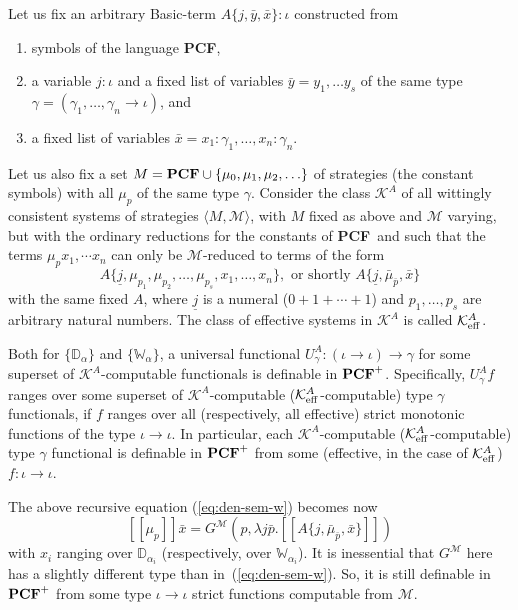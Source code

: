 \documentclass[fleqn]{LMCS}
\theoremstyle{plain}\newtheorem{satz}[thm]{Satz}
\theoremstyle{plain}\newtheorem{hyp}[thm]{Hypothesis}
\theoremstyle{plain}\newtheorem{hyps}[thm]{Hypotheses}
\theoremstyle{definition}\newtheorem{note}[thm]{Note}
\newcommand{\setof}[1]{\{#1\}}
\newcommand{\arr}{\rightarrow}
\newcommand{\la}{\langle}
\newcommand{\ra}{\rangle}
\newcommand{\Dsem}[1]{[\![ #1 ]\!]}
\newcommand{\tuple}[1]{\la #1 \ra}
\newcommand{\tbbW}{\mathbb{W}}\newcommand{\bbD}{\mathbb{D}}
\newcommand{\PCF}{\mbox{\bf PCF}}
\newcommand{\KA}{{\mathcal K}^A}
\newcommand{\KAeff}{{\mathcal K}^A_{\rm eff}}
\newcommand{\jj}{\underline{j}}
\newcommand{\MM}{{\mathcal M}}
\newcommand{\bx}{\bar{x}}
\newcommand{\?}{\mbox{?}}
\begin{document}
\noindent
Let us fix an arbitrary Basic-term $A\setof{j,\bar{y},\bx}:\iota$ 
constructed from 
\begin{enumerate}[$\bullet$]
\item 
symbols of the language \PCF,  
\item
a variable $j:\iota$ and a fixed list of variables
$\bar{y}=y_1,\ldots y_s$ of the same type 
$\gamma=(\gamma_1,\ldots,\gamma_n\arr \iota)$, and 
\item
a fixed list of variables 
$\bx=x_1:\gamma_1,\ldots,x_n:\gamma_n$. 
\end{enumerate}
Let us also fix a set $M=\PCF\cup\setof{\mu_0,\mu_1,\mu_2,\ldots}$ 
of strategies (the constant symbols) with all $\mu_p$ of the same type $\gamma$. 
Consider the class $\KA$ of all wittingly consistent systems of strategies 
$\tuple{M,\MM}$, with $M$ fixed as above  
and $\MM$ varying, but with the ordinary reductions for the 
constants of \PCF\ and such that the terms $\mu_p x_1,\cdots x_n$ 
can only be $\MM$-reduced to terms of the form 
\[
A\setof{\jj,\mu_{p_1},\mu_{p_2},\ldots,\mu_{p_s},x_1,\ldots,x_n}, 
\mbox{ or shortly }
A\setof{\jj,\bar{\mu}_{\bar{p}},\bx}
\]
with the same fixed $A$, 
where $\jj$ is a numeral ($0+1+\cdots+1$) and $p_1,\ldots,p_s$ 
are arbitrary  natural numbers. 
The class of effective systems in $\KA$ is called 
$\KAeff$.
\begin{lem}
\label{lemma:KA-universal}
Both for $\setof{\bbD_{\alpha}}$ and $\setof{\tbbW_{\alpha}}$, 
a universal functional 
\mbox{$U^A_{\gamma}:(\iota\arr\iota)\arr\gamma$} 
for some superset of $\KA$-computable functionals is definable in $\PCF^+$. 
Specifically, $U^A_\gamma f$ ranges over some superset of $\KA$-computable 
($\KAeff$-computable) type $\gamma$ functionals, 
if $f$ ranges over all (respectively, all effective) strict monotonic 
functions of the type 
$\iota\arr\iota$. 
In particular, each $\KA$-computable 
($\KAeff$-computable) type $\gamma$ functional 
is definable in $\PCF^+$ from some (effective, in the case of $\KAeff$) 
$f:\iota\arr\iota$. 
\end{lem}
\proof 
The above recursive equation (\ref{eq:den-sem-w}) becomes now 
\begin{equation}\label{eq:den-sem-w-special}
\Dsem{\mu_p}\bx=
G^{\MM}(p,\lambda j\bar{p}.
\Dsem{A\{j,\bar{\mu}_{\bar{p}},\bx\}})
\end{equation}
with $x_i$ ranging over $\bbD_{\alpha_i}$ (respectively, over $\tbbW_{\alpha_i}$).
It is inessential that $G^{\MM}$ here has a slightly different 
type than in~(\ref{eq:den-sem-w}). 
So, it is still definable in $\PCF^+$ from some type $\iota\arr\iota$ strict 
functions computable from $\MM$. 
\end{document}

